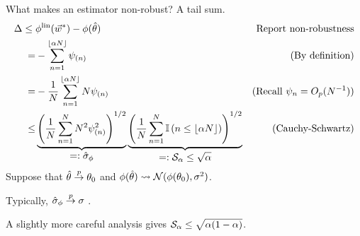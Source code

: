 

\begin{frame}{What makes an estimator non-robust?  A tail sum.}
%
\begin{align*}
%
\Delta \le{}& \thetafunlin(\w^*) - \thetafun(\thetahat)
        & \textrm{Report non-robustness}
    \\=&{} -\sum_{n=1}^{\lfloor \alpha N \rfloor} \infl_{(n)}
        & \textrm{(By definition)}
    \\=&{} -\frac{1}{N} \sum_{n=1}^{\lfloor \alpha N \rfloor} N \infl_{(n)}
        & \textrm{(Recall }\infl_n = O_p(N^{-1})\textrm{)}
    \\\le&{}
        \underbrace{
            \left( \meann N^2 \infl_{(n)}^2 \right)^{1/2}
        }_{\displaystyle =: \noise}
        \underbrace{
            \left( \meann \ind{n \le \lfloor \alpha N \rfloor} \right)^{1/2}
        }_{\displaystyle =: \shape \le \sqrt{\alpha}}
        & \textrm{(Cauchy-Schwartz)}
%
\end{align*}
%
Suppose that $\hat{\theta} \overset{p}{\rightarrow} \theta_0$ and $\phi(\hat{\theta})
\rightsquigarrow \mathcal{N}(\phi(\theta_0), \sigma^2)$.

Typically, $\hat\sigma_{\phi} \overset{p}{\rightarrow} \sigma$ \citep{hampel1986robustbook}.

A slightly more careful analysis gives $\mathcal{S}_\alpha \le \sqrt{\alpha(1-\alpha)}$.


\end{frame}




